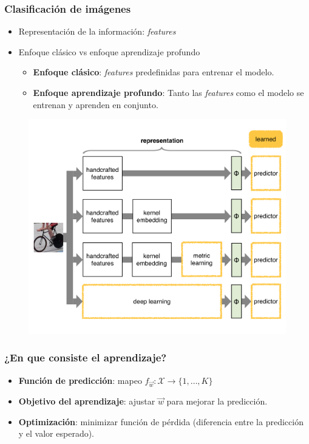 \documentclass[10pt,center]{beamer}
\begin{document}
\begin{frame}
  \frametitle{Clasificación de imágenes}
  \begin{itemize}
    \item Representación de la información: \textit{features}
    \item Enfoque clásico vs enfoque aprendizaje profundo
    \begin{itemize}
      \item \textbf{Enfoque clásico}: \textit{features} predefinidas para entrenar el modelo.
      \item \textbf{Enfoque aprendizaje profundo}: Tanto las \textit{features} como el modelo se entrenan y aprenden en conjunto.
    \end{itemize}
  \end{itemize}
  \begin{figure}[h]
  \captionsetup[subfigure]{labelformat=empty}
    \begin{center}
	    \includegraphics[height=0.6\textheight]{./img/vedaldi_shallow_deep.pdf}
    \end{center}
  \end{figure}
\end{frame}

\begin{frame}
  \frametitle{¿En que consiste el aprendizaje?}
  \begin{itemize}
    \item \textbf{Función de predicción}: mapeo $f_{\overrightarrow{w}}: \mathcal{X} {\rightarrow} \{1,\dots,K\}$
    \item \textbf{Objetivo del aprendizaje}: ajustar $\overrightarrow{w}$ para mejorar la predicción.
    \item \textbf{Optimización}: minimizar función de pérdida (diferencia entre la predicción y el valor esperado).
  \end{itemize}
\end{frame}
\end{document}
